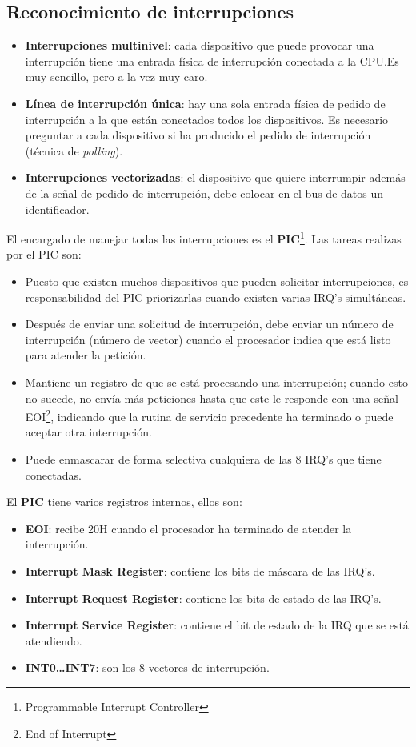 \subsection{Reconocimiento de interrupciones}

\begin{itemize}
  \item \textbf{Interrupciones multinivel}: cada dispositivo que puede provocar una interrupción tiene una entrada física de interrupción conectada a la CPU.\@ Es muy sencillo, pero a la vez muy caro.
  \item \textbf{Línea de interrupción única}: hay una sola entrada física de pedido de interrupción a la que están conectados todos los dispositivos. Es necesario preguntar a cada dispositivo si ha producido el pedido de interrupción (técnica de \textit{polling}).
  \item \textbf{Interrupciones vectorizadas}: el dispositivo que quiere interrumpir además de la señal de pedido de interrupción, debe colocar en el bus de datos un identificador.
\end{itemize}

El encargado de manejar todas las interrupciones es el \textbf{PIC}\footnote{Programmable Interrupt Controller}. Las tareas realizas por el PIC son:

\begin{itemize}
  \item Puesto que existen muchos dispositivos que pueden solicitar interrupciones, es responsabilidad del PIC priorizarlas cuando existen varias IRQ's simultáneas.
  \item Después de enviar una solicitud de interrupción, debe enviar un número de interrupción (número de vector) cuando el procesador indica que está listo para atender la petición.
  \item Mantiene un registro de que se está procesando una interrupción; cuando esto no sucede, no envía más peticiones hasta que este le responde con una señal EOI\footnote{End of Interrupt}, indicando que la rutina de servicio precedente ha terminado o puede aceptar otra interrupción.
  \item Puede enmascarar de forma selectiva cualquiera de las 8 IRQ's que tiene conectadas.
\end{itemize}

El \textbf{PIC} tiene varios registros internos, ellos son:

\begin{itemize}
  \item \textbf{EOI}: recibe 20H cuando el procesador ha terminado de atender la interrupción.
  \item \textbf{Interrupt Mask Register}: contiene los bits de máscara de las IRQ's.
  \item \textbf{Interrupt Request Register}: contiene los bits de estado de las IRQ's.
  \item \textbf{Interrupt Service Register}: contiene el bit de estado de la IRQ que se está atendiendo.
  \item \textbf{INT0\ldots INT7}: son los 8 vectores de interrupción.
\end{itemize}